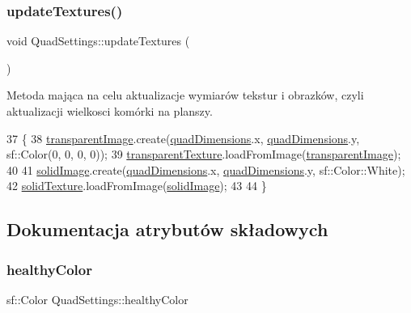 \subsubsection{\texorpdfstring{update\+Textures()}{updateTextures()}}
{\footnotesize\ttfamily void Quad\+Settings\+::update\+Textures (\begin{DoxyParamCaption}{ }\end{DoxyParamCaption})}

Metoda mająca na celu aktualizacje wymiarów tekstur i obrazków, czyli aktualizacji wielkosci komórki na planszy. 
\begin{DoxyCode}
37 \{
38     \mbox{\hyperlink{class_quad_settings_a0278924ea9c2eabc3fee5b1407cd36e8}{transparentImage}}.create(\mbox{\hyperlink{class_quad_settings_abb4a967873d7a93098ef168b894280d6}{quadDimensions}}.x, 
      \mbox{\hyperlink{class_quad_settings_abb4a967873d7a93098ef168b894280d6}{quadDimensions}}.y, sf::Color(0, 0, 0, 0));
39     \mbox{\hyperlink{class_quad_settings_a5b25effa96e1e0c522377ea31f0ec1b0}{transparentTexture}}.loadFromImage(\mbox{\hyperlink{class_quad_settings_a0278924ea9c2eabc3fee5b1407cd36e8}{transparentImage}});
40 
41     \mbox{\hyperlink{class_quad_settings_ae9f7a44f5a5f20cb0f388bfac92bf776}{solidImage}}.create(\mbox{\hyperlink{class_quad_settings_abb4a967873d7a93098ef168b894280d6}{quadDimensions}}.x, \mbox{\hyperlink{class_quad_settings_abb4a967873d7a93098ef168b894280d6}{quadDimensions}}.y, 
      sf::Color::White);
42     \mbox{\hyperlink{class_quad_settings_a8d11211eb4f03a6eb386e246818de660}{solidTexture}}.loadFromImage(\mbox{\hyperlink{class_quad_settings_ae9f7a44f5a5f20cb0f388bfac92bf776}{solidImage}});
43 
44 \}
\end{DoxyCode}


\subsection{Dokumentacja atrybutów składowych}
\mbox{\label{class_quad_settings_ad170bfeb3a4bc5157107cc07eba36067}} 
\subsubsection{\texorpdfstring{healthy\+Color}{healthyColor}}
{\footnotesize\ttfamily sf\+::\+Color Quad\+Settings\+::healthy\+Color}

